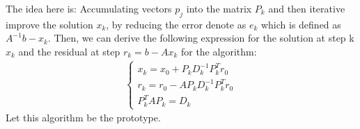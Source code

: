 \documentclass[]{article}
\theoremstyle{definition}
\begin{document}
            The idea here is: Accumulating vectors $p_j$ into the matrix $P_k$ and then iterative improve the solution $x_k$, by reducing the error denote as $e_k$ which is defined as $A^{-1}b - x_k$. Then, we can derive the following expression for the solution at step k $x_k$ and the residual at step $r_k = b - Ax_k$ for the algorithm: 
            \begin{align}
                \begin{cases}
                    x_k = x_0 + P_kD^{-1}_kP^T_kr_0
                    \\
                    r_k = r_0 - AP_kD^{-1}_kP^T_k r_0
                    \\
                    P^T_kAP_k = D_k
                \end{cases}
            \end{align}
            Let this algorithm be the prototype. 
\end{document}
